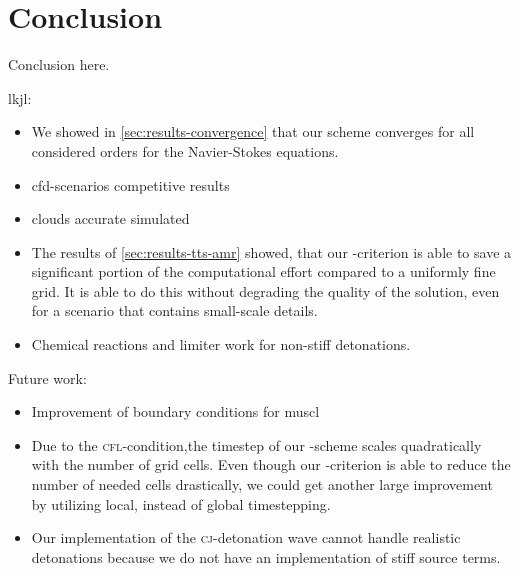 \chapter{Conclusion}\label{chap:conclusion}
Conclusion here.

lkjl:
\begin{itemize}
\item We showed in \cref{sec:results-convergence} that our scheme converges for all considered orders for the Navier-Stokes equations.
\item cfd-scenarios competitive results
\item clouds accurate simulated
\item The results of \cref{sec:results-tts-amr} showed, that our \amr{}-criterion is able to save a significant portion of the computational effort compared to a uniformly fine grid.
  It is able to do this without degrading the quality of the solution, even for a scenario that contains small-scale details.
\item Chemical reactions and limiter work for non-stiff detonations.
\end{itemize}

Future work:
\begin{itemize}
\item Improvement of boundary conditions for muscl
\item Due to the \textsc{cfl}-condition,the timestep of our \aderdg{}-scheme scales quadratically with the number of grid cells.
  Even though our \amr{}-criterion is able to reduce the number of needed cells drastically, we could get another large improvement by utilizing local, instead of global timestepping.
\item Our implementation of the \textsc{cj}-detonation wave cannot handle realistic detonations because we do not have an implementation of stiff source terms.
\end{itemize}
